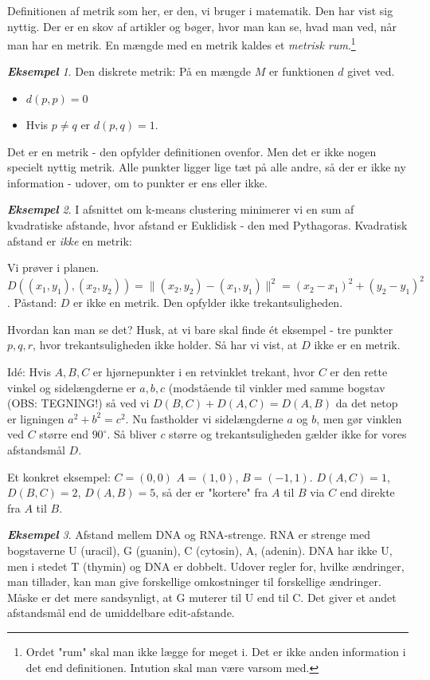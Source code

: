 \documentclass[a4paper, 12pt]{article}
\theoremstyle{remark}
\newtheorem{Eksempel}{\textbf{Eksempel}}
\begin{document}
Definitionen af metrik som her, er den, vi bruger i matematik. Den har vist sig nyttig. Der er en skov af artikler og bøger, hvor man kan se, hvad man ved, når man har  en metrik. En mængde med en metrik kaldes et \emph{metrisk rum}.\footnote{Ordet "rum"  skal man ikke lægge for meget i. Det er ikke anden information i det end definitionen. Intution skal man være varsom med.}
\begin{Eksempel}
Den diskrete metrik: På en mængde $M$ er funktionen $d$ givet ved. 
\begin{itemize}
\item $d(p,p)=0$
\item Hvis $p\neq q$ er $d(p,q)=1$.
\end{itemize}
Det er en metrik - den opfylder definitionen ovenfor. Men det er ikke nogen specielt nyttig metrik. Alle punkter ligger lige tæt på alle andre, så der er ikke ny information - udover, om  to punkter er ens eller ikke.
\end{Eksempel}
\begin{Eksempel} I afsnittet om k-means clustering minimerer vi en sum af kvadratiske afstande, hvor afstand er Euklidisk - den med Pythagoras. Kvadratisk afstand er \emph{ikke} en metrik: 

Vi prøver i planen. $D((x_1,y_1),(x_2,y_2))=\|(x_2,y_2)-(x_1,y_1)\|^2=(x_2-x_1)^2+(y_2-y_1)^2$. Påstand: $D$ er ikke en metrik. Den opfylder ikke trekantsuligheden.

Hvordan kan man se det? Husk, at vi bare skal finde ét eksempel - tre punkter $p,q,r$, hvor trekantsuligheden ikke holder. Så har vi vist, at $D$ ikke er en metrik. 

Idé: Hvis $A,B,C$ er hjørnepunkter i en retvinklet trekant, hvor $C$ er den rette vinkel og sidelængderne er $a,b,c$ (modstående til vinkler med samme bogstav (OBS: TEGNING!)
så ved vi $D(B,C)+D(A,C)=D(A,B)$ da det netop er ligningen $a^2+b^2=c^2$. Nu fastholder vi sidelængderne $a$ og $b$, men gør vinklen ved $C$ større end $90^\circ$. Så bliver $c$ større og trekantsuligheden gælder ikke for vores afstandsmål $D$.

Et konkret eksempel: $C=(0,0)$ $A=(1,0)$, $B=(-1,1)$. $D(A,C)=1$, $D(B,C)=2$, $D(A,B)=5$, så der er "kortere" fra $A$ til $B$ via $C$ end direkte fra $A$ til $B$.
\end{Eksempel}
\begin{Eksempel} Afstand mellem DNA og RNA-strenge. RNA er strenge med bogstaverne U (uracil), G (guanin), C (cytosin), A, (adenin). DNA har ikke U, men i stedet T (thymin) og DNA er dobbelt. 
 Udover regler for, hvilke ændringer, man tillader, kan man give forskellige omkostninger til forskellige ændringer. Måske er det mere sandsynligt, at G muterer til U  end til C. Det giver et andet afstandsmål end de umiddelbare edit-afstande. 

\end{Eksempel}
\end{document}
